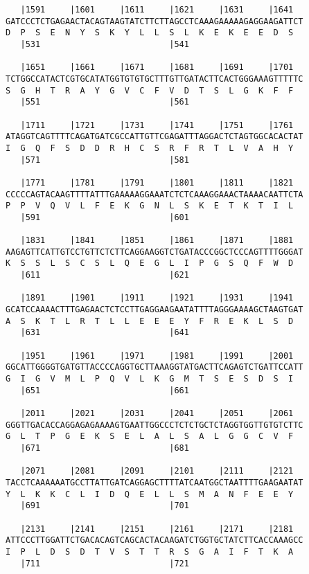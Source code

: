 \documentclass{article}
\begin{document}
\begin{Verbatim}
   |1591     |1601     |1611     |1621     |1631     |1641  
GATCCCTCTGAGAACTACAGTAAGTATCTTCTTAGCCTCAAAGAAAAAGAGGAAGATTCT
D  P  S  E  N  Y  S  K  Y  L  L  S  L  K  E  K  E  E  D  S  
   |531                          |541                       
  
   |1651     |1661     |1671     |1681     |1691     |1701  
TCTGGCCATACTCGTGCATATGGTGTGTGCTTTGTTGATACTTCACTGGGAAAGTTTTTC
S  G  H  T  R  A  Y  G  V  C  F  V  D  T  S  L  G  K  F  F  
   |551                          |561                       
  
   |1711     |1721     |1731     |1741     |1751     |1761  
ATAGGTCAGTTTTCAGATGATCGCCATTGTTCGAGATTTAGGACTCTAGTGGCACACTAT
I  G  Q  F  S  D  D  R  H  C  S  R  F  R  T  L  V  A  H  Y  
   |571                          |581                       
  
   |1771     |1781     |1791     |1801     |1811     |1821  
CCCCCAGTACAAGTTTTATTTGAAAAAGGAAATCTCTCAAAGGAAACTAAAACAATTCTA
P  P  V  Q  V  L  F  E  K  G  N  L  S  K  E  T  K  T  I  L  
   |591                          |601                       
  
   |1831     |1841     |1851     |1861     |1871     |1881  
AAGAGTTCATTGTCCTGTTCTCTTCAGGAAGGTCTGATACCCGGCTCCCAGTTTTGGGAT
K  S  S  L  S  C  S  L  Q  E  G  L  I  P  G  S  Q  F  W  D  
   |611                          |621                       
  
   |1891     |1901     |1911     |1921     |1931     |1941  
GCATCCAAAACTTTGAGAACTCTCCTTGAGGAAGAATATTTTAGGGAAAAGCTAAGTGAT
A  S  K  T  L  R  T  L  L  E  E  E  Y  F  R  E  K  L  S  D  
   |631                          |641                       
  
   |1951     |1961     |1971     |1981     |1991     |2001  
GGCATTGGGGTGATGTTACCCCAGGTGCTTAAAGGTATGACTTCAGAGTCTGATTCCATT
G  I  G  V  M  L  P  Q  V  L  K  G  M  T  S  E  S  D  S  I  
   |651                          |661                       
  
   |2011     |2021     |2031     |2041     |2051     |2061  
GGGTTGACACCAGGAGAGAAAAGTGAATTGGCCCTCTCTGCTCTAGGTGGTTGTGTCTTC
G  L  T  P  G  E  K  S  E  L  A  L  S  A  L  G  G  C  V  F  
   |671                          |681                       
  
   |2071     |2081     |2091     |2101     |2111     |2121  
TACCTCAAAAAATGCCTTATTGATCAGGAGCTTTTATCAATGGCTAATTTTGAAGAATAT
Y  L  K  K  C  L  I  D  Q  E  L  L  S  M  A  N  F  E  E  Y  
   |691                          |701                       
  
   |2131     |2141     |2151     |2161     |2171     |2181  
ATTCCCTTGGATTCTGACACAGTCAGCACTACAAGATCTGGTGCTATCTTCACCAAAGCC
I  P  L  D  S  D  T  V  S  T  T  R  S  G  A  I  F  T  K  A  
   |711                          |721                       
  

\end{Verbatim}
\end{document}
